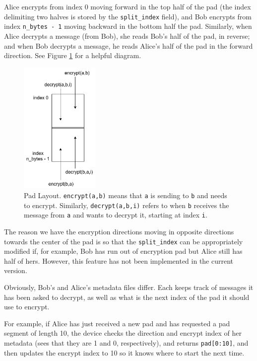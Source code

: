\documentclass[twocolumn]{article}
\begin{document}
Alice encrypts from index 0 moving forward in the top half of the pad (the index delimiting two halves is stored by the \texttt{split\_index} field), and Bob encrypts from index \texttt{n\_bytes - 1} moving backward in the bottom half the pad. Similarly, when Alice decrypts a message (from Bob), she reads Bob's half of the pad, in reverse; and when Bob decrypts a message, he reads Alice's half of the pad in the forward direction. See Figure \ref{fig:padsplit} for a helpful diagram.

\begin{figure}[htp]
\centering
\includegraphics[width=1.5in]{padsplit}
\caption{Pad Layout. \texttt{encrypt(a,b)} means that \texttt{a} is sending to \texttt{b} and needs to encrypt. Similarly, \texttt{decrypt(a,b,i)} refers to  when \texttt{b} receives the message from \texttt{a} and wants to decrypt it, starting at index \texttt{i}.}
\label{fig:padsplit}
\end{figure}

The reason we have the encryption directions moving in opposite directions towards the center of the pad is so that the \texttt{split\_index} can be appropriately modified if, for example, Bob has run out of encryption pad but Alice still has half of hers. However, this feature has not been implemented in the current version.

Obviously, Bob's and Alice's metadata files differ. Each keeps track of messages it has been asked to decrypt, as well as what is the next index of the pad it should use to encrypt.

For example, if Alice has just received a new pad and has requested a pad segment of length 10, the device checks the direction and encrypt index of her metadata (sees that they are 1 and 0, respectively), and returns \texttt{pad[0:10]}, and then updates the encrypt index to 10 so it knows where to start the next time.
\end{document}
